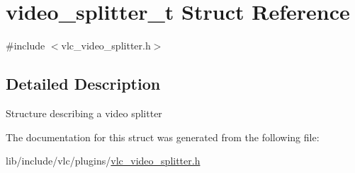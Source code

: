 \hypertarget{structvideo__splitter__t}{}\section{video\+\_\+splitter\+\_\+t Struct Reference}
\label{structvideo__splitter__t}


{\ttfamily \#include $<$vlc\+\_\+video\+\_\+splitter.\+h$>$}



\subsection{Detailed Description}
Structure describing a video splitter 

The documentation for this struct was generated from the following file\+:\begin{DoxyCompactItemize}
\item 
lib/include/vlc/plugins/\hyperlink{vlc__video__splitter_8h}{vlc\+\_\+video\+\_\+splitter.\+h}\end{DoxyCompactItemize}
